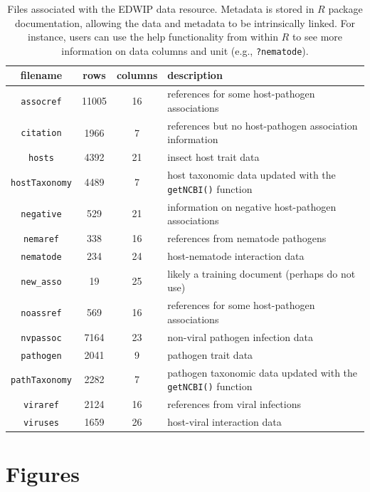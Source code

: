 \documentclass[12pt]{article}
\begin{document}
\begin{table}[ht]
\centering
\caption{Files associated with the EDWIP data resource. Metadata is stored in $R$ package documentation, allowing the data and metadata to be intrinsically linked. For instance, users can use the help functionality from within $R$ to see more information on data columns and unit (e.g., \texttt{?nematode}). }
\label{tab:data}
\begin{tabular}{cccp{8cm}}
  \hline
  filename & rows & columns & description \\
  \hline
   \texttt{assocref} & 11005  & 16 & references for some host-pathogen associations  \\
   \texttt{citation} & 1966  & 7  & references but no host-pathogen association information  \\
   \texttt{hosts} & 4392  & 21  & insect host trait data\\   
   \texttt{hostTaxonomy} & 4489  & 7  & host taxonomic data updated with the \texttt{getNCBI()} function \\
   \texttt{negative} & 529  & 21  & information on negative host-pathogen associations  \\
   \texttt{nemaref} & 338  & 16  & references from nematode pathogens  \\
   \texttt{nematode} & 234  & 24  & host-nematode interaction data \\   
   \texttt{new\_asso} & 19  & 25  & likely a training document (perhaps do not use)  \\ 
   \texttt{noassref} & 569  & 16  &  references for some host-pathogen associations  \\
   \texttt{nvpassoc} & 7164  & 23  & non-viral pathogen infection data  \\   
   \texttt{pathogen} & 2041  & 9  &  pathogen trait data  \\   
   \texttt{pathTaxonomy} & 2282  & 7  & pathogen taxonomic data updated with the \texttt{getNCBI()} function  \\
   \texttt{viraref} & 2124  & 16  & references from viral infections  \\   
   \texttt{viruses} & 1659  & 26  & host-viral interaction data  \\      
  \hline
\end{tabular}
\end{table}





\clearpage 


\section*{Figures}
\end{document}
